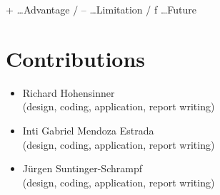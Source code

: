 \documentclass[runningheads]{llncs}
\begin{document}
+ \ldots Advantage / -- \ldots Limitation / f \ldots Future


\section{Contributions}
\begin{itemize}
  \item Richard Hohensinner \\ (design, coding, application, report writing)
  \item Inti Gabriel Mendoza Estrada \\ (design, coding, application, report writing)
  \item Jürgen Suntinger-Schrampf \\ (design, coding, application, report writing)
\end{itemize}






%
\end{document}
